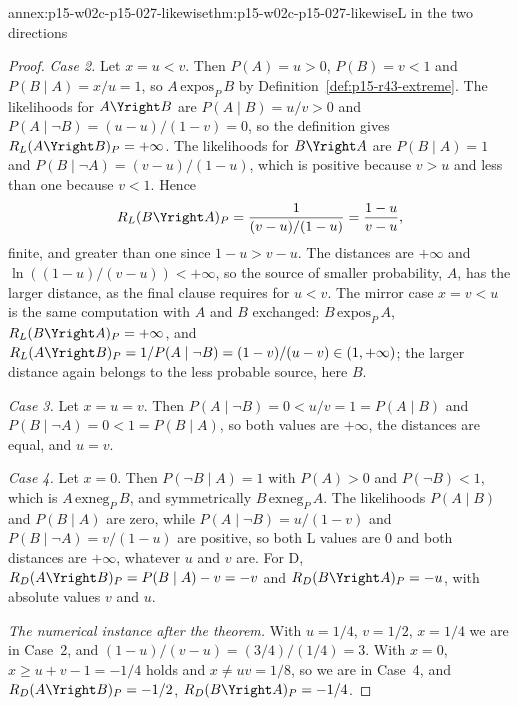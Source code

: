 \begin{annexitem}{annex:p15-w02c-p15-027-likewise}{thm:p15-w02c-p15-027-likewise}{L in the two directions}
\begin{proof}
\emph{Case 2.} Let \(x=u<v\). Then \(P(A)=u>0\), \(P(B)=v<1\) and
\(P(B\mid A)=x/u=1\), so \(A\,\mathrm{expos}_P\,B\) by
Definition~\ref{def:p15-r43-extreme}. The likelihoods for
\(A\Yright B\) are \(P(A\mid B)=u/v>0\) and
\(P(A\mid\neg B)=(u-u)/(1-v)=0\), so the definition gives
\(R_L(A\Yright B)_P=+\infty\). The likelihoods for \(B\Yright A\) are
\(P(B\mid A)=1\) and \(P(B\mid\neg A)=(v-u)/(1-u)\), which is positive
because \(v>u\) and less than one because \(v<1\). Hence
\[
 R_L(B\Yright A)_P=\frac{1}{(v-u)/(1-u)}=\frac{1-u}{v-u},
\]
finite, and greater than one since \(1-u>v-u\). The distances are
\(+\infty\) and \(\ln((1-u)/(v-u))<+\infty\), so the source of smaller
probability, \(A\), has the larger distance, as the final clause
requires for \(u<v\). The mirror case \(x=v<u\) is the same computation
with \(A\) and \(B\) exchanged: \(B\,\mathrm{expos}_P\,A\),
\(R_L(B\Yright A)_P=+\infty\), and
\(R_L(A\Yright B)_P=1/P(A\mid\neg B)=(1-v)/(u-v)\in(1,+\infty)\);
the larger distance again belongs to the less probable source, here
\(B\).

\emph{Case 3.} Let \(x=u=v\). Then \(P(A\mid\neg B)=0<u/v=1=P(A\mid B)\)
and \(P(B\mid\neg A)=0<1=P(B\mid A)\), so both values are \(+\infty\),
the distances are equal, and \(u=v\).

\emph{Case 4.} Let \(x=0\). Then \(P(\neg B\mid A)=1\) with
\(P(A)>0\) and \(P(\neg B)<1\), which is \(A\,\mathrm{exneg}_P\,B\), and
symmetrically \(B\,\mathrm{exneg}_P\,A\). The likelihoods \(P(A\mid B)\)
and \(P(B\mid A)\) are zero, while \(P(A\mid\neg B)=u/(1-v)\) and
\(P(B\mid\neg A)=v/(1-u)\) are positive, so both L values are
\(0\) and both distances are \(+\infty\), whatever \(u\) and \(v\) are.
For D, \(R_D(A\Yright B)_P=P(B\mid A)-v=-v\) and
\(R_D(B\Yright A)_P=-u\), with absolute values \(v\) and \(u\).

\emph{The numerical instance after the theorem.} With \(u=1/4\),
\(v=1/2\), \(x=1/4\) we are in Case~2, and
\((1-u)/(v-u)=(3/4)/(1/4)=3\). With \(x=0\), \(x\geq u+v-1=-1/4\) holds
and \(x\ne uv=1/8\), so we are in Case~4, and
\(R_D(A\Yright B)_P=-1/2\), \(R_D(B\Yright A)_P=-1/4\).
\end{proof}
\end{annexitem}

